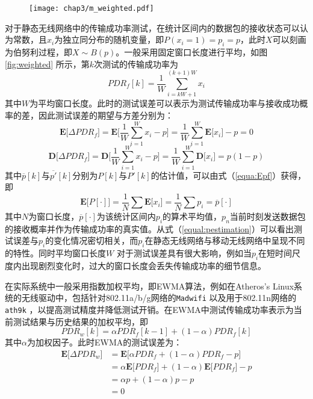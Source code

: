 \begin{figure}[!htp]
\centering
\texttt{[image: chap3/m\_weighted.pdf]}
\end{figure}

对于静态无线网络中的传输成功率测试，在统计区间内的数据包的接收状态可以认为常数，且$x_i$为独立同分布的随机变量，即$P(x_i=1)=p_i=p$，此时$X$可以刻画为伯努利过程，即$X\sim B(p)$。一般采用固定窗口长度进行平均，如图 \ref{fig:weighted} 所示，第$k$次测试的传输成功率为
\begin{equation}
PDR_f[k]=\frac{1}{W}\sum_{i=kW+1}^{(k+1)W}{x_i}
\label{equa:pdr_f}
\end{equation}
其中$W$为平均窗口长度。此时的测试误差可以表示为测试传输成功率与接收成功概率的差，因此测试误差的期望与方差分别为：
\begin{equation}
 \textbf{E[}\Delta PDR_f\textbf{]}=\textbf{E[}\frac{1}{W}\sum_{i=1}^{W}{x_i}-p\textbf{]}=\frac{1}{W}\sum_{i=1}^{W}{\textbf{E[}x_i\textbf{]}}-p=0
\label{equa:Epf}
\end{equation}
\begin{equation}
 \textbf{D[}\Delta PDR_f\textbf{]}=\textbf{D[}\frac{1}{W}\sum_{i=1}^{W}{x_i}-p\textbf{]}=\frac{1}{W}\sum_{i=1}^{W}{\textbf{D[}x_i\textbf{]}}=p(1-p)
\label{equal:Dpf}
\end{equation}
其中$\overline{p}[k]$与$\overline{p'}[k]$分别为$P[k]$与$P'[k]$的估计值，可以由式（\ref{equa:Epf}）获得，即
\begin{equation}
 \textbf{E[}P[\cdot]\textbf{]}=\frac{1}{N}\sum\textbf{E[}x_i\textbf{]}=\frac{1}{N}\sum{p_i}=\overline{p}[\cdot]
\label{equal:pestimation}
\end{equation}
其中$N$为窗口长度，$\overline{p}[\cdot]$为该统计区间内$p_i$的算术平均值，$p_n$当前时刻发送数据包的接收概率并作为传输成功率的真实值。从式（\ref{equal:pestimation}）可以看出测试误差与$p_i$的变化情况密切相关，而$p_i$在静态无线网络与移动无线网络中呈现不同的特性。同时平均窗口长度$W$ 对于测试误差具有很大影响，例如当$p_i$在短时间尺度内出现剧烈变化时，过大的窗口长度会丢失传输成功率的细节信息。

在实际系统中一般采用指数加权平均，即EWMA算法，例如在Atheros's Linux系统的无线驱动中，包括针对802.11a/b/g网络的\texttt{Madwifi}  以及用于802.11n网络的\texttt{ath9k} ，以提高测试精度并降低测试开销。在EWMA中测试传输成功率表示为当前测试结果与历史结果的加权平均，即
\begin{equation}
 PDR_w[k]=\alpha PDR_f[k-1]+(1-\alpha)PDR_f[k]
\label{equal:pdr_w}
\end{equation}
其中$\alpha$为加权因子。此时EWMA的测试误差为：
\begin{equation}
\begin{split}
 \textbf{E[}\Delta PDR_w\textbf{]}&=\textbf{E[}\alpha PDR_f+(1-\alpha)PDR_f-p\textbf{]}\\
         &=\alpha \textbf{E[}PDR_f\textbf{]}+(1-\alpha)\textbf{E[}PDR_f\textbf{]}-p\\
         &=\alpha p + (1-\alpha) p-p\\
         &=0
\end{split}
\label{equa:Epw}
\end{equation}

